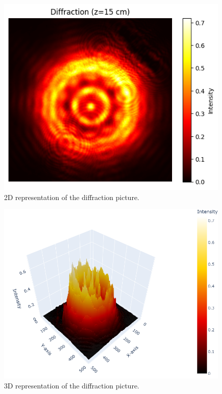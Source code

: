 \documentclass[prl,twocolumn]{revtex4-1}
\begin{document}
\begin{figure}[!b]
    \centering
    \includegraphics[width=\linewidth]{Images/diffraction_example.png}
    \caption{2D representation of the diffraction picture.}
    \label{fig:diffraction_example}
\end{figure}

\begin{figure}[!b]
    \centering
    \includegraphics[width=\linewidth]{Images/3d_diffraction_example.png}
    \caption{3D representation of the diffraction picture.}
    \label{fig:3d_diffraction_example}
\end{figure}
\end{document}
